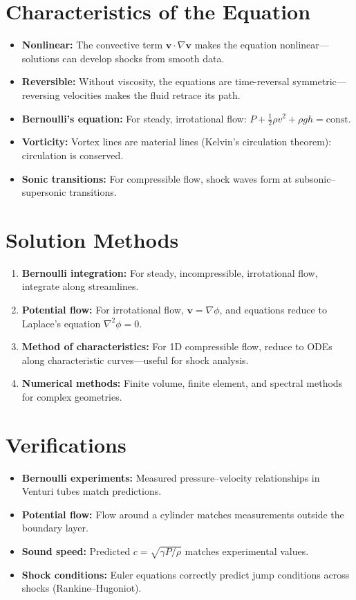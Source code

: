 \documentclass[11pt,openright]{book}
\begin{document}
\section*{Characteristics of the Equation}

\begin{itemize}
\item \textbf{Nonlinear:} The convective term $\mathbf{v} \cdot \nabla \mathbf{v}$ makes the equation nonlinear---solutions can develop shocks from smooth data.
\item \textbf{Reversible:} Without viscosity, the equations are time-reversal symmetric---reversing velocities makes the fluid retrace its path.
\item \textbf{Bernoulli's equation:} For steady, irrotational flow: $P + \frac{1}{2}\rho v^2 + \rho gh = \text{const}$.
\item \textbf{Vorticity:} Vortex lines are material lines (Kelvin's circulation theorem): circulation is conserved.
\item \textbf{Sonic transitions:} For compressible flow, shock waves form at subsonic--supersonic transitions.
\end{itemize}
\section*{Solution Methods}

\begin{enumerate}
\item \textbf{Bernoulli integration:} For steady, incompressible, irrotational flow, integrate along streamlines.
\item \textbf{Potential flow:} For irrotational flow, $\mathbf{v} = \nabla\phi$, and equations reduce to Laplace's equation $\nabla^2 \phi = 0$.
\item \textbf{Method of characteristics:} For 1D compressible flow, reduce to ODEs along characteristic curves---useful for shock analysis.
\item \textbf{Numerical methods:} Finite volume, finite element, and spectral methods for complex geometries.
\end{enumerate}
\section*{Verifications}

\begin{itemize}
\item \textbf{Bernoulli experiments:} Measured pressure--velocity relationships in Venturi tubes match predictions.
\item \textbf{Potential flow:} Flow around a cylinder matches measurements outside the boundary layer.
\item \textbf{Sound speed:} Predicted $c = \sqrt{\gamma P / \rho}$ matches experimental values.
\item \textbf{Shock conditions:} Euler equations correctly predict jump conditions across shocks (Rankine--Hugoniot).
\end{itemize}
\end{document}
